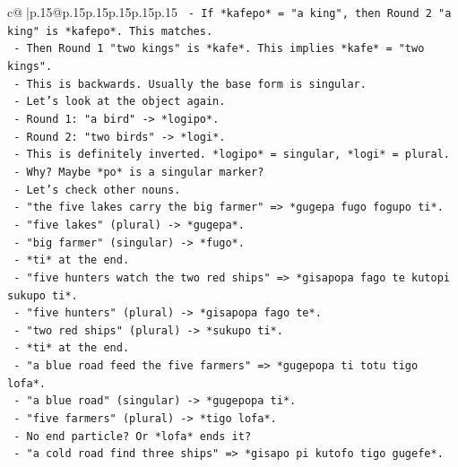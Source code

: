 \documentclass{article}
\begin{document}
{\begin{supertabular}{c@{$\;$}|p{.15\linewidth}@{}p{.15\linewidth}p{.15\linewidth}p{.15\linewidth}p{.15\linewidth}p{.15\linewidth}}
{{{\texttt{                  {-} If *kafepo* = "a king", then Round 2 "a king" is *kafepo*. This matches.} \\
\texttt{                  {-} Then Round 1 "two kings" is *kafe*. This implies *kafe* = "two kings".} \\
\texttt{                  {-} This is backwards. Usually the base form is singular.} \\
\texttt{              {-} Let's look at the object again.} \\
\texttt{                {-} Round 1: "a bird" {-}> *logipo*.} \\
\texttt{                {-} Round 2: "two birds" {-}> *logi*.} \\
\texttt{                {-} This is definitely inverted. *logipo* = singular, *logi* = plural.} \\
\texttt{                {-} Why? Maybe *po* is a singular marker?} \\
\texttt{                {-} Let's check other nouns.} \\
\texttt{                {-} "the five lakes carry the big farmer" => *gugepa fugo fogupo ti*.} \\
\texttt{                  {-} "five lakes" (plural) {-}> *gugepa*.} \\
\texttt{                  {-} "big farmer" (singular) {-}> *fugo*.} \\
\texttt{                  {-} *ti* at the end.} \\
\texttt{                {-} "five hunters watch the two red ships" => *gisapopa fago te kutopi sukupo ti*.} \\
\texttt{                  {-} "five hunters" (plural) {-}> *gisapopa fago te*.} \\
\texttt{                  {-} "two red ships" (plural) {-}> *sukupo ti*.} \\
\texttt{                  {-} *ti* at the end.} \\
\texttt{                {-} "a blue road feed the five farmers" => *gugepopa ti totu tigo lofa*.} \\
\texttt{                  {-} "a blue road" (singular) {-}> *gugepopa ti*.} \\
\texttt{                  {-} "five farmers" (plural) {-}> *tigo lofa*.} \\
\texttt{                  {-} No end particle? Or *lofa* ends it?} \\
\texttt{                {-} "a cold road find three ships" => *gisapo pi kutofo tigo gugefe*.} \\
}}}
\end{supertabular}}
\end{document}
